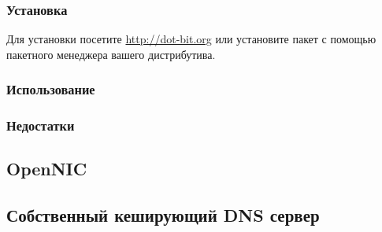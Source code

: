 \subsubsection{Установка}
Для установки посетите \url{http://dot-bit.org} или установите пакет с помощью пакетного менеджера вашего дистрибутива.
\subsubsection{Использование}
\subsubsection{Недостатки}
\subsection{OpenNIC}
\subsection{Собственный кеширующий DNS сервер}
